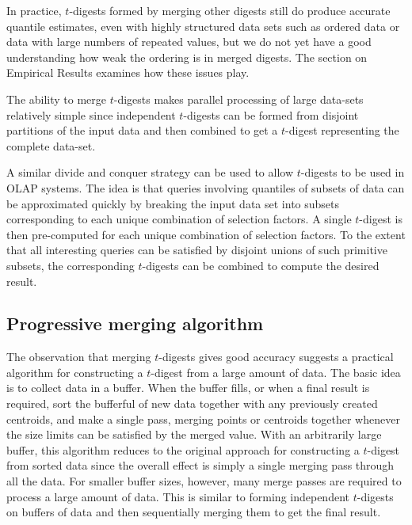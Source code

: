 \documentclass[11pt]{amsart}
\begin{document}
In practice, $t$-digests formed by merging other digests still do produce accurate quantile estimates, even with highly structured data sets such as ordered data or data with large numbers of repeated values, but we do not yet have a good understanding how weak the ordering is in merged digests. The section on Empirical Results examines how these issues play.

The ability to merge $t$-digests makes parallel processing of large data-sets relatively simple since independent $t$-digests can be formed from disjoint partitions of the input data and then combined to get a $t$-digest representing the complete data-set.

A similar divide and conquer strategy can be used to allow $t$-digests to be used in OLAP systems. The idea is that queries involving quantiles of subsets of data can be approximated quickly by breaking the input data set into subsets corresponding to each unique combination of selection factors. A single $t$-digest is then pre-computed for each unique combination of selection factors. To the extent that all interesting queries can be satisfied by disjoint unions of such primitive subsets, the corresponding $t$-digests can be combined to compute the desired result.

\subsection{Progressive merging algorithm}
The observation that merging $t$-digests gives good accuracy suggests a practical algorithm for constructing a $t$-digest from a large amount of data. The basic idea is to collect data in a buffer. When the buffer fills, or when a final result is required, sort the bufferful of new data together with any previously created centroids, and make a single pass, merging points or centroids together whenever the size limits can be satisfied by the merged value. With an arbitrarily large buffer, this algorithm reduces to the original approach for constructing a $t$-digest from sorted data since the overall effect is simply a single merging pass through all the data. For smaller buffer sizes, however, many merge passes are required to process a large amount of data. This is similar to forming independent $t$-digests on buffers of data and then sequentially merging them to get the final result.
\end{document}
